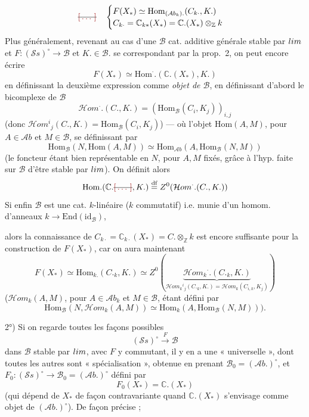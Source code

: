 \documentclass[11pt,a4paper]{article}
\begin{document}
\[
  \text{\struck{\ill{}}} \quad
  \begin{cases}
    F(X_{*}) \simeq \mathrm{Hom}_{(\mathcal{A}b_{k}).}(C_{k\cdot}, K.) \\
    C_{k\cdot} = \mathbb{C}_{k*}(X_{*}) = \mathbb{C}.(X_{*}) \otimes_{\mathbb{Z}} k
  \end{cases}
\]
Plus généralement, revenant au cas d'une $\mathcal{B}$ cat. additive générale
stable par $\varinjlim$ et $F : (\mathcal{S}s)^{\circ} \to \mathcal{B}$ et
$K. \in \mathcal{B}.$ se correspondant par la prop.~2, on peut encore écrire
\[
  F(X_{*}) \simeq \mathrm{Hom}^{\cdot}.(\mathbb{C}.(X_{*}), K.)
\]
en définissant la deuxième expression comme \emph{objet de $\mathcal{B}$}, en
définissant d'abord le bicomplexe de $\mathcal{B}$
\[
  \mathcal{H}om^{\cdot}.(C., K.) = (\mathrm{Hom}_{\mathcal{B}}(C_{i}, K_{j}))_{i,j}
\]
(donc $\mathcal{H}om^{i}{}_{j}(C., K.) = \mathrm{Hom}_{\mathcal{B}}(C_{i}, K_{j})$)
--- où l'objet $\mathrm{Hom}(A, M)$, pour $A \in \mathcal{A}b$ et $M \in \mathcal{B}$,
se définissant par
\[
  \mathrm{Hom}_{\mathcal{B}}(N, \mathrm{Hom}(A, M)) \simeq \mathrm{Hom}_{\mathcal{A}b}(A, \mathrm{Hom}_{\mathcal{B}}(N, M))
\]
(le foncteur \struck{\ill{}}  \struck{\ill{}} étant bien
représentable en $N$, pour $A, M$ fixés, grâce à l'hyp. faite sur $\mathcal{B}$
d'être stable par $\varprojlim$).
On définit alors
\[
  \mathrm{Hom}.(\mathbb{C}.\text{\struck{\ill{}}}, K.) \overset{\text{df}}{=} Z^{0}(\mathcal{H}om^{\cdot}.(C., K.))
\]
Si enfin $\mathcal{B}$ est une cat. $k$-linéaire ($k$ commutatif) i.e. munie d'un
homom. d'anneaux $k \to \mathrm{End}(\mathrm{id}_{\mathcal{B}})$,

alors la connaissance de $C_{k\cdot} = \mathbb{C}_{k\cdot}(X_{*}) = C. \otimes_{\mathbb{Z}} k$
est encore suffisante pour la construction de $F(X_{*})$, car on aura maintenant
\[
  F(X_{*}) \simeq \mathrm{Hom}_{k.}(C._{k}, K.)
  \simeq Z^{0}(\underbrace{\mathcal{H}om_{k}{}^{\cdot}.(C._{k}, K.)}_{\mathcal{H}om_{k}{}^{i}{}_{j}(C._{k}, K.) = \mathcal{H}om_{k}(C_{i,k}, K_{j})})
\]
($\mathcal{H}om_{k}(A, M)$, pour $A \in \mathcal{A}b_{k}$ et $M \in \mathcal{B}$, étant défini par
\[
  \mathrm{Hom}_{\mathcal{B}}(N, \mathcal{H}om_{k}(A, M)) \simeq \mathrm{Hom}_{k}(A, \mathrm{Hom}_{\mathcal{B}}(N, M))).
\]

2°) Si on regarde toutes les façons possibles  
\[
  (\mathcal{S}s)^{\circ} \xrightarrow{\ F\ } \mathcal{B}
\]
dans $\mathcal{B}$ stable par $\varprojlim$, avec $F$ y commutant, il y en a
\struck{\ill{}} une « universelle », dont toutes les autres sont « spécialisation »,
obtenue en prenant $\mathcal{B}_{0} = (\mathcal{A}b.)^{\circ}$, et
$F_{0} : (\mathcal{S}s)^{\circ} \to \mathcal{B}_{0} = (\mathcal{A}b.)^{\circ}$ défini par
\[
  F_{0}(X_{*}) = \mathbb{C}.(X_{*})
\]
(qui dépend de $X_{*}$ de façon contravariante quand $\mathbb{C}.(X_{*})$ s'envisage
comme objet de $(\mathcal{A}b.)^{\circ}$). De façon précise ;
\end{document}
